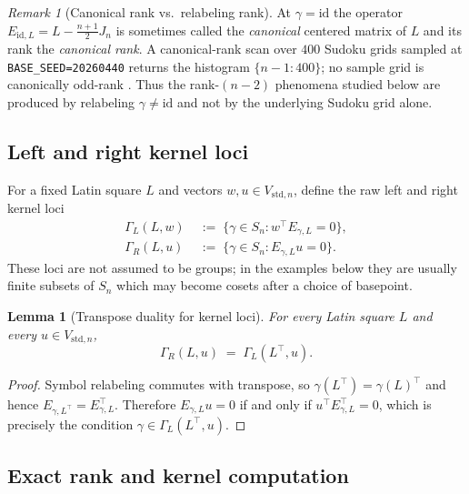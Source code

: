 \documentclass[11pt,a4paper]{article}
\newtheorem{lemma}[theorem]{Lemma}
\theoremstyle{definition}
\theoremstyle{remark}
\newtheorem{remark}[theorem]{Remark}
\newcommand{\Vstdn}{V_{\mathrm{std},n}}
\begin{document}
\begin{remark}[Canonical rank vs.\ relabeling rank]
\label{rmk:canonical-vs-relabeling}
At $\gamma = \mathrm{id}$ the operator
$E_{\mathrm{id},L} = L - \tfrac{n+1}{2} J_n$ is sometimes called the
\emph{canonical} centered matrix of $L$ and its rank the
\emph{canonical rank}. A canonical-rank scan over $400$ Sudoku grids
sampled at \texttt{BASE\_SEED=20260440} returns the histogram
$\{n-1\!:\!400\}$; no sample grid is canonically odd-rank
\cite{HAN-RankParity}. Thus the rank-$(n-2)$ phenomena studied below
are produced by relabeling $\gamma \neq \mathrm{id}$ and not by the
underlying Sudoku grid alone.
\end{remark}

\subsection{Left and right kernel loci}\label{sec:setup-left-right-loci}

For a fixed Latin square $L$ and vectors $w,u \in \Vstdn$, define the
raw left and right kernel loci
\begin{align}
   \Gamma_L(L,w)
      &\;:=\; \bigl\{\gamma \in S_n : w^{\!\top}E_{\gamma,L}=0\bigr\},
      \label{eq:GammaL-def}\\
   \Gamma_R(L,u)
      &\;:=\; \bigl\{\gamma \in S_n : E_{\gamma,L}u=0\bigr\}.
      \label{eq:GammaR-def}
\end{align}
These loci are not assumed to be groups; in the examples below they
are usually finite subsets of $S_n$ which may become cosets after a
choice of basepoint.

\begin{lemma}[Transpose duality for kernel loci]\label{lem:left-right-duality}
For every Latin square $L$ and every $u \in \Vstdn$,
\begin{equation}\label{eq:left-right-duality}
   \Gamma_R(L,u) \;=\; \Gamma_L(L^{\!\top},u).
\end{equation}
\end{lemma}

\begin{proof}
Symbol relabeling commutes with transpose, so
$\gamma(L^{\!\top})=\gamma(L)^{\!\top}$ and hence
$E_{\gamma,L^{\!\top}}=E_{\gamma,L}^{\!\top}$. Therefore
$E_{\gamma,L}u=0$ if and only if
$u^{\!\top}E_{\gamma,L}^{\!\top}=0$, which is precisely the condition
$\gamma\in\Gamma_L(L^{\!\top},u)$.
\end{proof}

\subsection{Exact rank and kernel computation}\label{sec:setup-exact}
\end{document}
